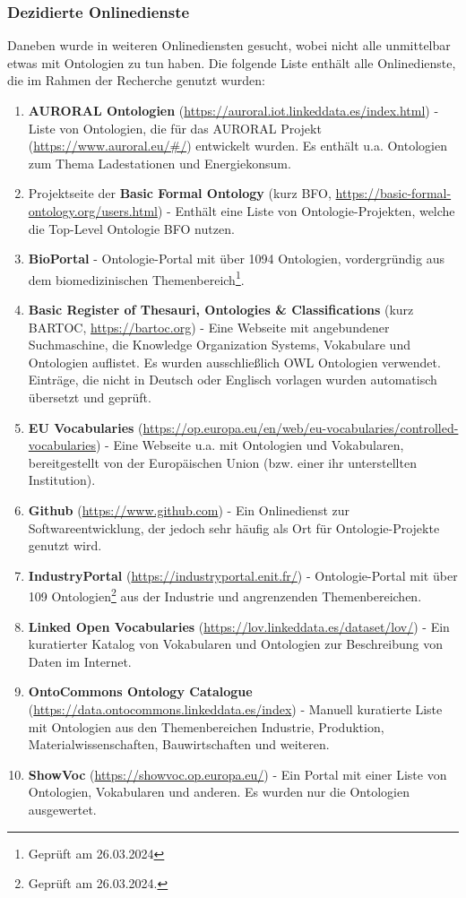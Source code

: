 \documentclass{article}
\begin{document}
\subsubsection{Dezidierte Onlinedienste}

Daneben wurde in weiteren Onlinediensten gesucht, wobei nicht alle unmittelbar etwas mit Ontologien zu tun haben.
Die folgende Liste enthält alle Onlinedienste, die im Rahmen der Recherche genutzt wurden:

\begin{enumerate}
    \item \textbf{AURORAL Ontologien} (\url{https://auroral.iot.linkeddata.es/index.html}) - Liste von Ontologien, die für das AURORAL Projekt (\url{https://www.auroral.eu/#/}) entwickelt wurden. Es enthält u.a. Ontologien zum Thema Ladestationen und Energiekonsum.
    \item Projektseite der \textbf{Basic Formal Ontology} (kurz BFO, \url{https://basic-formal-ontology.org/users.html}) - Enthält eine Liste von Ontologie-Projekten, welche die Top-Level Ontologie BFO nutzen.
    \item \textbf{BioPortal} - Ontologie-Portal mit über 1094 Ontologien, vordergründig aus dem biomedizinischen Themenbereich\footnote{Geprüft am 26.03.2024}.
    \item \textbf{Basic Register of Thesauri, Ontologies \& Classifications} (kurz BARTOC, \url{https://bartoc.org}) - Eine Webseite mit angebundener Suchmaschine, die Knowledge Organization Systems, Vokabulare und Ontologien auflistet. Es wurden ausschließlich OWL Ontologien verwendet. Einträge, die nicht in Deutsch oder Englisch vorlagen wurden automatisch übersetzt und geprüft.
    \item \textbf{EU Vocabularies} (\url{https://op.europa.eu/en/web/eu-vocabularies/controlled-vocabularies}) - Eine Webseite u.a. mit Ontologien und Vokabularen, bereitgestellt von der Europäischen Union (bzw. einer ihr unterstellten Institution).
    \item \textbf{Github} (\url{https://www.github.com}) - Ein Onlinedienst zur Softwareentwicklung, der jedoch sehr häufig als Ort für Ontologie-Projekte genutzt wird.
    \item \textbf{IndustryPortal} (\url{https://industryportal.enit.fr/}) - Ontologie-Portal mit über 109 Ontologien\footnote{Geprüft am 26.03.2024.} aus der Industrie und angrenzenden Themenbereichen.
    \item \textbf{Linked Open Vocabularies} (\url{https://lov.linkeddata.es/dataset/lov/}) - Ein kuratierter Katalog von Vokabularen und Ontologien zur Beschreibung von Daten im Internet.
    \item \textbf{OntoCommons Ontology Catalogue} (\url{https://data.ontocommons.linkeddata.es/index}) - Manuell kuratierte Liste mit Ontologien aus den Themenbereichen Industrie, Produktion, Materialwissenschaften, Bauwirtschaften und weiteren.
    \item \textbf{ShowVoc} (\url{https://showvoc.op.europa.eu/}) - Ein Portal mit einer Liste von Ontologien, Vokabularen und anderen. Es wurden nur die Ontologien ausgewertet.
\end{enumerate}
\end{document}
